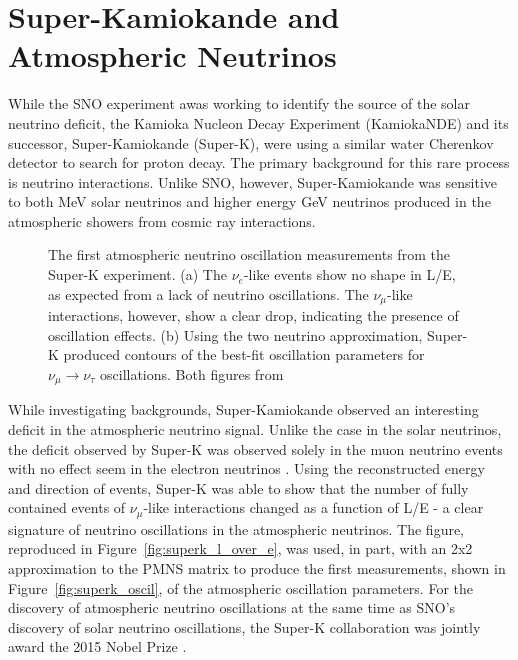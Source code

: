 \section{Super-Kamiokande and Atmospheric Neutrinos}
While the SNO experiment awas working to identify the source of the solar neutrino deficit, the Kamioka Nucleon Decay Experiment (KamiokaNDE) and its successor, Super-Kamiokande (Super-K), were using a similar water Cherenkov detector to search for proton decay.
The primary background for this rare process is neutrino interactions.
Unlike SNO, however, Super-Kamiokande was sensitive to both MeV solar neutrinos and higher energy GeV neutrinos produced in the atmospheric showers from cosmic ray interactions. 

\begin{figure}[!h]%
	\centering
	\caption{The first atmospheric neutrino oscillation measurements from the Super-K experiment. (a) The $\nu_e$-like events show no shape in L/E, as expected from a lack of neutrino oscillations. The $\nu_\mu$-like interactions, however, show a clear drop, indicating the presence of oscillation effects. (b) Using the two neutrino approximation, Super-K produced contours of the best-fit oscillation parameters for $\nu_\mu\rightarrow\nu_\tau$ oscillations. Both figures from \cite{SuperK-Oscillations}}%
\end{figure}


While investigating backgrounds, Super-Kamiokande observed an interesting deficit in the atmospheric neutrino signal.
Unlike the case in the solar neutrinos, the deficit observed by Super-K was observed solely in the muon neutrino events with no effect seem in the electron neutrinos \cite{SuperK-Oscillations}.
Using the reconstructed energy and direction of events, Super-K was able to show that the number of fully contained events of $\nu_\mu$-like interactions changed as a function of L/E - a clear signature of neutrino oscillations in the atmospheric neutrinos.
The figure, reproduced in Figure~\ref{fig:superk_l_over_e}, was used, in part, with an 2x2 approximation to the PMNS matrix to produce the first measurements, shown in Figure~\ref{fig:superk_oscil}, of the atmospheric oscillation parameters.
For the discovery of atmospheric neutrino oscillations at the same time as SNO's discovery of solar neutrino oscillations, the Super-K collaboration was jointly award the 2015 Nobel Prize \cite{NobelPrize:2015-Oscillations}.


